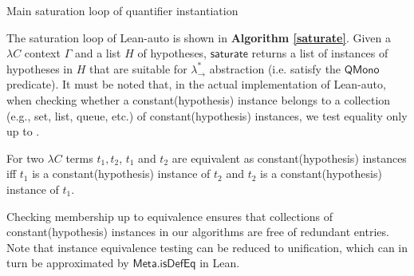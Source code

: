 \begin{algorithm}\label{saturate}
  \DontPrintSemicolon
  \SetNoFillComment
  \caption{Main saturation loop of quantifier instantiation}
\end{algorithm}

\noindent The saturation loop of Lean-auto is shown in \textbf{Algorithm \ref{saturate}}.
Given a $\lambda C$ context $\Gamma$ and a list $H$ of hypotheses, $\mathsf{saturate}$ returns
a list of instances of hypotheses in $H$ that are suitable for $\lambda_\to^*$ abstraction
(i.e. satisfy the $\mathsf{QMono}$ predicate).
It must be noted that, in the actual implementation of Lean-auto, when
checking whether a constant(hypothesis) instance belongs to a collection (e.g., set, list, queue, etc.)
of constant(hypothesis) instances, we test equality only up to .

\begin{definition}
For two $\lambda C$ terms $t_1, t_2$, $t_1$ and $t_2$ are equivalent as constant(hypothesis) instances
iff $t_1$ is a constant(hypothesis) instance of $t_2$ and $t_2$ is a constant(hypothesis)
instance of $t_1$.
\end{definition}

\noindent Checking membership up to equivalence ensures that collections of constant(hypothesis)
instances in our algorithms are free of redundant entries. Note that instance equivalence testing
can be reduced to unification, which can in turn be approximated by $\mathsf{Meta.isDefEq}$ in Lean.
 